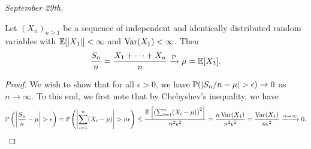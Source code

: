 \textit{September 29th.}

\begin{theorem}
    Let $(X_{n})_{n \geq 1}$ be a sequence of independent and identically distributed random variables with $\mathbb{E}[\left| X_{1} \right|] < \infty$ and $\operatorname{Var}(X_{1}) < \infty$. Then
    \begin{align}
        \frac{S_{n}}{n} =\frac{X_{1} + \cdots + X_{n}}{n} \xrightarrow{\operatorname{P}} \mu = \mathbb{E}[X_{1}].
    \end{align}
\end{theorem}
\begin{proof}
    We wish to show that for all $\epsilon > 0$, we have $\mathbb{P}(\left| S_{n}/n - \mu \right| > \epsilon) \to 0$ as $n \to \infty$. To this end, we first note that by Chebyshev's inequality, we have
    \begin{align}
        \mathbb{P}\left( \left| \frac{S_{n}}{n}-\mu \right| > \epsilon \right) = \mathbb{P}\left( \left| \sum_{i=1}^{n}(X_{i}-\mu) \right| > n\epsilon \right) \leq \frac{\mathbb{E}\left[ \left( \sum_{i=1}^{n}(X_{i}-\mu) \right)^2 \right]}{n^2\epsilon^2} = \frac{n \operatorname{Var}(X_{1})}{n^2\epsilon^2} = \frac{\operatorname{Var}(X_{1})}{n\epsilon^2} \xrightarrow{n \to \infty} 0.
    \end{align}
\end{proof}

